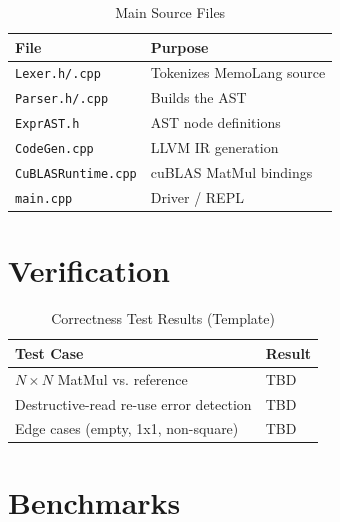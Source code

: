 \documentclass[a4paper]{article}
\begin{document}

\begin{table}[h]
\centering
\caption{Main Source Files}
\label{tab:modules}
\begin{tabular}{ll}
\toprule
File & Purpose \\
\midrule
\texttt{Lexer.h/.cpp} & Tokenizes MemoLang source \\
\texttt{Parser.h/.cpp} & Builds the AST \\
\texttt{ExprAST.h} & AST node definitions \\
\texttt{CodeGen.cpp} & LLVM IR generation \\
\texttt{CuBLASRuntime.cpp} & cuBLAS MatMul bindings \\
\texttt{main.cpp} & Driver / REPL \\
\bottomrule
\end{tabular}
\end{table}


\section{Verification}


\begin{table}[h]
\centering
\caption{Correctness Test Results (Template)}
\label{tab:verification}
\begin{tabular}{ll}
\toprule
Test Case & Result \\
\midrule
$N \times N$ MatMul vs. reference & TBD \\
Destructive-read re-use error detection & TBD \\
Edge cases (empty, 1x1, non-square) & TBD \\
\bottomrule
\end{tabular}
\end{table}

\section{Benchmarks}
\end{document}
